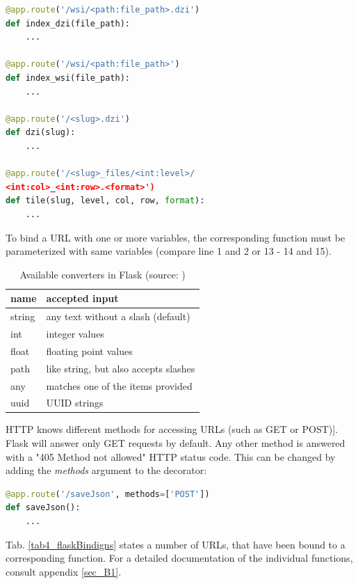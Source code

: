 \begin{lstlisting}[language=Python, frame=single]
@app.route('/wsi/<path:file_path>.dzi')
def index_dzi(file_path):
	...

@app.route('/wsi/<path:file_path>')
def index_wsi(file_path):
	...

@app.route('/<slug>.dzi')
def dzi(slug):
	...

@app.route('/<slug>_files/<int:level>/
<int:col>_<int:row>.<format>')
def tile(slug, level, col, row, format):
	...
\end{lstlisting}\clearpage

To bind a URL with one or more variables, the corresponding function must be parameterized with same variables (compare line 1 and 2 or 13 - 14 and 15)\cite{web:flask}.

\begin{table}[H]
	\begin{center}
		\begin{tabular}{| l | l |}
			\hline
			\textbf{name} & \textbf{accepted input}\\ \hline
			string & any text without a slash (default)\\ \hline
			int & integer values\\ \hline
			float & floating point values\\ \hline
			path & like string, but also accepts slashes \\ \hline
			any & matches one of the items provided\\ \hline
			uuid & UUID strings\\ \hline
		\end{tabular}
		\caption{Available converters in Flask (source: \cite{web:flask})}
		\label{tab4_converter}
	\end{center}
\end{table}

HTTP knows different methods for accessing URLs (such as GET or POST)\cite{web:w3c}]. Flask will answer only GET requests by default. Any other method is answered with a "405 Method not allowed" HTTP status code\cite{web:flask}. This can be changed by adding the \emph{methods} argument to the decorator:

\begin{lstlisting}[language=Python, frame=single]
@app.route('/saveJson', methods=['POST'])
def saveJson():
	...
\end{lstlisting}

Tab. \ref{tab4_flaskBindigns} states a number of URLs, that have been bound to a corresponding function. For a detailed documentation of the individual functions, consult appendix \ref{sec_B1}.

